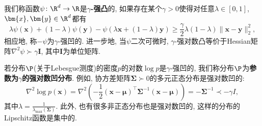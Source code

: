 我们称函数$\psi \colon \R^d \to \R$是\textbf{$\gamma$-强凸}的, 如果存在某个$\gamma > 0$使得对任意$\lambda \in [0,1]$, $\bm{x}, \bm{y} \in \R^d$都有
\begin{equation*}
	\lambda \psi(\bm{x}) + (1-\lambda) \psi(\bm{y}) - \psi(\lambda \bm{x} + (1-\lambda) \bm{y})
	\geq \frac{\gamma}{2} \lambda (1-\lambda) \|\bm{x} - \bm{y}\|_2^2, 
\end{equation*}
相应地, 称$-\psi$为$\gamma$-强凹的. 
进一步地, 当$\psi$二次可微时, $\gamma$-强对数凸等价于Hessian矩阵$\nabla^2 \psi \succ \gamma \bm{I}$, 其中$\bm{I}$为单位矩阵. 

若分布$\P$(关于Lebesgue测度)的密度$p$的对数$\log p$是$\gamma$-强凹的, 我们称分布$\P$为\textbf{参数为$\gamma$的强对数凹分布}. 
例如, 协方差矩阵$\bm{\Sigma} \succ 0$的多元正态分布是强对数凹的: 
\begin{equation*}
	\nabla^2 \log p(\bm{x})
	= \nabla^2 \left( -\frac{1}{2} (\bm{x} - \bm{\mu})^{\top} \bm{\Sigma}^{-1} (\bm{x} - \bm{\mu})  \right)
	= - \bm{\Sigma}^{-1} 
	\prec - \gamma I, 
\end{equation*}
其中$\lambda = \frac{1}{\lambda_{\max}(\bm{\Sigma})}$. 
此外, 也有很多非正态分布也是强对数凹的, 这样的分布的Lipschitz函数是集中的. 

